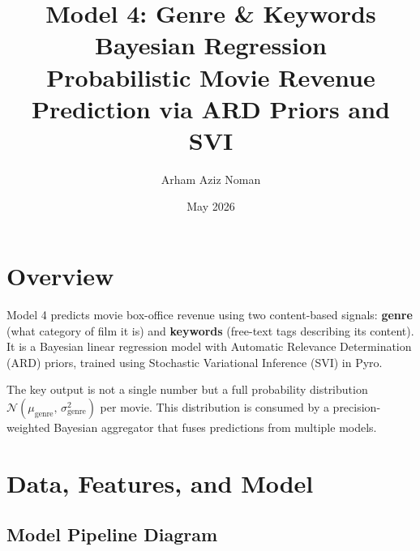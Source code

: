 \documentclass[12pt,a4paper]{article}
\title{\textbf{Model 4: Genre \& Keywords Bayesian Regression} \\
\large Probabilistic Movie Revenue Prediction via ARD Priors and SVI}
\author{Arham Aziz Noman}
\date{May 2026}
\begin{document}
\maketitle
\tableofcontents
\newpage

\section{Overview}

Model 4 predicts movie box-office revenue using two content-based signals:
\textbf{genre} (what category of film it is) and \textbf{keywords} (free-text tags
describing its content). It is a Bayesian linear regression model with
Automatic Relevance Determination (ARD) priors, trained using Stochastic
Variational Inference (SVI) in Pyro.

The key output is not a single number but a full probability distribution
$\mathcal{N}(\mu_{\text{genre}},\, \sigma_{\text{genre}}^2)$ per movie.
This distribution is consumed by a precision-weighted Bayesian aggregator
that fuses predictions from multiple models.

\section{Data, Features, and Model}

\subsection{Model Pipeline Diagram}
\end{document}
